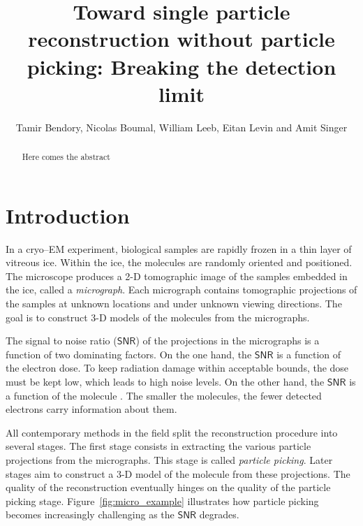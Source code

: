 \documentclass[english,11pt]{article}
\newcommand{\1}{\mathbf{1}}
\newcommand{\TODO}[1]{{\color{red}{[#1]}}}
\numberwithin{equation}{section}
\theoremstyle{plain}
\theoremstyle{definition}
\theoremstyle{remark}
\theoremstyle{plain}
\theoremstyle{remark}
\theoremstyle{plain}
\theoremstyle{plain}
\newcommand{\SNR}{\ensuremath{\textsf{SNR}}}
\begin{document}
\title{Toward single particle reconstruction without particle picking: Breaking the detection limit}


\author{Tamir Bendory, Nicolas Boumal, William Leeb, Eitan Levin and Amit Singer}
\maketitle

\begin{abstract}
	Here comes the abstract
\end{abstract}

\section{Introduction}

\TODO{Revise--Cryo--electron microscopy (cryo--EM) is an innovative technology for single particle reconstruction (SPR) of macromolecules.} 
% 
In a cryo--EM experiment, biological samples are rapidly frozen in a thin layer of vitreous ice. Within the ice, the molecules are randomly oriented and positioned. The microscope produces a 2-D tomographic image of the samples embedded in the ice, called a \emph{micrograph}. Each micrograph contains tomographic projections of the samples at unknown locations and under unknown viewing directions. The goal is to construct 3-D models of the molecules from the micrographs.

The signal to noise ratio ($\SNR$) of the projections in the micrographs is a function of two dominating factors. On the one hand, the $\SNR$ is a function of the electron dose. To keep radiation damage within acceptable bounds, the dose must be kept low, which leads to high noise levels. On the other hand, the $\SNR$ is a function of the molecule \TODO{size/weight}. The smaller the molecules, the fewer detected electrons carry information about them.

All contemporary methods in the field split the reconstruction procedure into several stages.
The first stage consists in extracting the various particle projections from the micrographs. This stage is called \emph{particle picking}. Later stages aim to construct a 3-D model of the molecule from these projections. The quality of the reconstruction eventually hinges on the quality of the particle picking stage. Figure~\ref{fig:micro_example} illustrates how particle picking becomes increasingly challenging as the $\SNR$ degrades.
\end{document}
